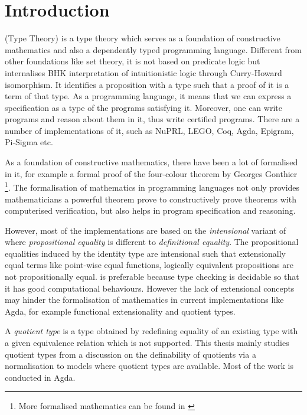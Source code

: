 \chapter{Introduction}

\mltt (Type Theory) is a type theory which serves as a foundation of constructive mathematics and also a dependently typed programming language. Different from other foundations like set theory, it is not based on predicate logic but internalises BHK interpretation of intuitionistic logic through Curry-Howard isomorphism. It identifies a proposition with a type such that a proof of it is a term of that type. 
As a programming language, it means that we can express a specification as a type of the programs satisfying it.
Moreover, one can write programs and reason about them in it, thus write certified programs. There are a number of implementations of it, such as NuPRL, LEGO, Coq, Agda, Epigram, Pi-Sigma etc.


As a foundation of constructive mathematics, there have been a lot of \maths formalised in it, for example a formal proof of the four-colour theorem by Georges Gonthier \cite{gonthier08ams} \footnote{More formalised mathematics can be found in \cite{sbfm}}. The formalisation of mathematics in programming languages not only provides mathematicians a powerful theorem prove to constructively prove theorems with computerised verification, but also helps in program specification and reasoning. 




However, most of the implementations are based on the \emph{intensional} variant of \mltt where \emph{propositional equality} is different to \emph{definitional equality}. The propositional equalities induced by the identity type are intensional such that extensionally equal terms like point-wise equal functions, logically equivalent propositions are not propositionally equal. \itt is preferable because type checking is decidable so that it has good computational behaviours. However the lack of extensional concepts may hinder the formalisation of mathematics in current implementations like Agda, for example functional extensionality and quotient types.







A \emph{quotient type} is a type obtained by redefining equality of an existing type with a given equivalence relation which is not supported. This thesis mainly studies quotient types from a discussion on the definability of quotients via a normalisation to models where quotient types are available. Most of the work is conducted in Agda.


